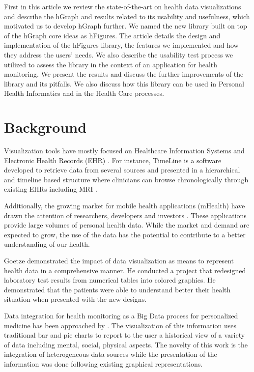 \documentclass[twocolumn]{bmcart}%
\begin{document}
First in this article we review the state-of-the-art on health data visualizations and describe the hGraph and results related to its usability and usefulness, which motivated us to develop hGraph further. We named the new library built on top of the hGraph core ideas as hFigures. The article details the design and implementation of the hFigures library, the features we implemented and how they address the users' needs. We also describe the usability test process we utilized to assess the library in the context of an application for health monitoring. We present the results and discuss the further improvements of the library and its pitfalls. We also discuss how this library can be used in Personal Health Informatics and in the Health Care processes.

\section*{Background}



Visualization tools have mostly focused on Healthcare Information Systems and Electronic Health Records (EHR) \cite{lesselroth2011data}. For instance, TimeLine is a software developed to retrieve data from several sources and presented in a hierarchical and timeline based structure where clinicians can browse chronologically through existing EHRs including MRI \cite{bui2007information}.

Additionally, the growing market for mobile health applications (mHealth) have drawn the attention of researchers, developers and investors \cite{mHealth2014}. These applications provide large volumes of personal health data. While the market and demand are expected to grow, the use of the data has the potential to contribute to a better understanding of our health.

Goetze \cite{goetz2015} demonstrated the impact of data visualization as means to represent health data in a comprehensive manner. He conducted a project that redesigned laboratory test results from numerical tables into colored graphics. He demonstrated that the patients were able to understand better their health situation when presented with the new designs.

Data integration for health monitoring as a Big Data process for personalized medicine has been approached by \cite{7072838}. The visualization of this information uses traditional bar and pie charts to report to the user a historical view of a variety of data including mental, social, physical aspects. The novelty of this work is the integration of heterogeneous data sources while the presentation of the information was done following existing graphical representations.
\end{document}
